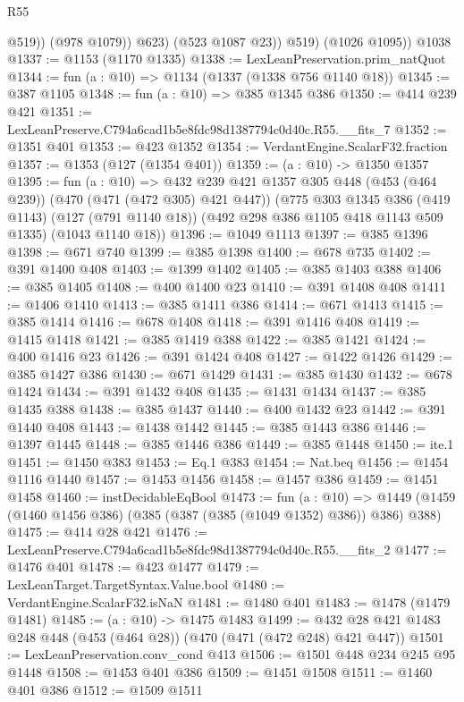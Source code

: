 \begin{lexlean}{R55}
\begin{coremodule}
                  @519))
              (@978 @1079))
            @623)
          (@523 @1087 @23))
        @519)
      (@1026 @1095))
    @1038
@1337 := @1153 (@1170 @1335)
@1338 := LexLeanPreservation.prim_natQuot
@1344 := fun (a : @10) => @1134 (@1337 (@1338 @756 @1140 @18))
@1345 := @387 @1105
@1348 := fun (a : @10) => @385 @1345 @386
@1350 := @414 @239 @421
@1351 := LexLeanPreserve.C794a6cad1b5e8fdc98d1387794c0d40c.R55.__fits_7
@1352 := @1351 @401
@1353 := @423 @1352
@1354 := VerdantEngine.ScalarF32.fraction
@1357 := @1353 (@127 (@1354 @401))
@1359 := (a : @10) -> @1350 @1357
@1395 := fun (a : @10) =>
  @432
    @239
    @421
    @1357
    @305
    @448
    (@453 (@464 @239))
    (@470 (@471 (@472 @305) @421 @447))
    (@775
      @303
      @1345
      @386
      (@419 @1143)
      (@127 (@791 @1140 @18))
      (@492 @298 @386 @1105 @418 @1143 @509 @1335)
      (@1043 @1140 @18))
@1396 := @1049 @1113
@1397 := @385 @1396
@1398 := @671 @740
@1399 := @385 @1398
@1400 := @678 @735
@1402 := @391 @1400 @408
@1403 := @1399 @1402
@1405 := @385 @1403 @388
@1406 := @385 @1405
@1408 := @400 @1400 @23
@1410 := @391 @1408 @408
@1411 := @1406 @1410
@1413 := @385 @1411 @386
@1414 := @671 @1413
@1415 := @385 @1414
@1416 := @678 @1408
@1418 := @391 @1416 @408
@1419 := @1415 @1418
@1421 := @385 @1419 @388
@1422 := @385 @1421
@1424 := @400 @1416 @23
@1426 := @391 @1424 @408
@1427 := @1422 @1426
@1429 := @385 @1427 @386
@1430 := @671 @1429
@1431 := @385 @1430
@1432 := @678 @1424
@1434 := @391 @1432 @408
@1435 := @1431 @1434
@1437 := @385 @1435 @388
@1438 := @385 @1437
@1440 := @400 @1432 @23
@1442 := @391 @1440 @408
@1443 := @1438 @1442
@1445 := @385 @1443 @386
@1446 := @1397 @1445
@1448 := @385 @1446 @386
@1449 := @385 @1448
@1450 := ite.{1}
@1451 := @1450 @383
@1453 := Eq.{1} @383
@1454 := Nat.beq
@1456 := @1454 @1116 @1440
@1457 := @1453 @1456
@1458 := @1457 @386
@1459 := @1451 @1458
@1460 := instDecidableEqBool
@1473 := fun (a : @10) =>
  @1449 (@1459 (@1460 @1456 @386) (@385 (@387 (@385 (@1049 @1352) @386)) @386) @388)
@1475 := @414 @28 @421
@1476 := LexLeanPreserve.C794a6cad1b5e8fdc98d1387794c0d40c.R55.__fits_2
@1477 := @1476 @401
@1478 := @423 @1477
@1479 := LexLeanTarget.TargetSyntax.Value.bool
@1480 := VerdantEngine.ScalarF32.isNaN
@1481 := @1480 @401
@1483 := @1478 (@1479 @1481)
@1485 := (a : @10) -> @1475 @1483
@1499 := @432 @28 @421 @1483 @248 @448 (@453 (@464 @28)) (@470 (@471 (@472 @248) @421 @447))
@1501 := LexLeanPreservation.conv_cond @413
@1506 := @1501 @448 @234 @245 @95 @1448
@1508 := @1453 @401 @386
@1509 := @1451 @1508
@1511 := @1460 @401 @386
@1512 := @1509 @1511

\end{coremodule}
\end{lexlean}
